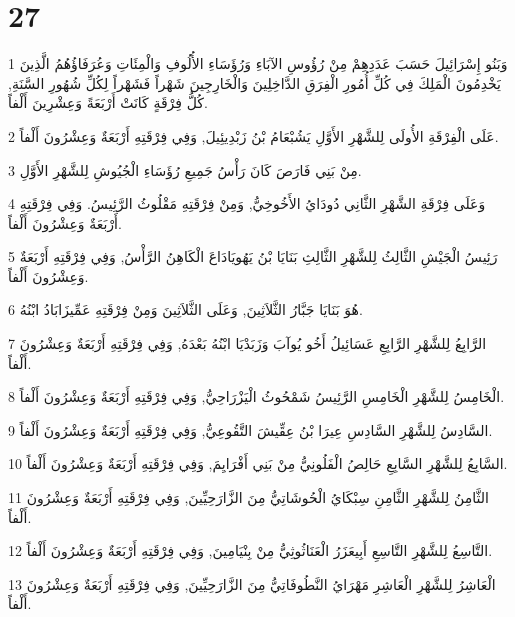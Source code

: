 \chapter{27}

\par 1 وَبَنُو إِسْرَائِيلَ حَسَبَ عَدَدِهِمْ مِنْ رُؤُوسِ الآبَاءِ وَرُؤَسَاءِ الأُلُوفِ وَالْمِئَاتِ وَعُرَفَاؤُهُمُ الَّذِينَ يَخْدِمُونَ الْمَلِكَ فِي كُلِّ أُمُورِ الْفِرَقِ الدَّاخِلِينَ وَالْخَارِجِينَ شَهْراً فَشَهْراً لِكُلِّ شُهُورِ السَّنَةِ, كُلُّ فِرْقَةٍ كَانَتْ أَرْبَعَةً وَعِشْرِينَ أَلْفاً.
\par 2 عَلَى الْفِرْقَةِ الأُولَى لِلشَّهْرِ الأَوَّلِ يَشُبْعَامُ بْنُ زَبْدِيئِيلَ, وَفِي فِرْقَتِهِ أَرْبَعَةٌ وَعِشْرُونَ أَلْفاً.
\par 3 مِنْ بَنِي فَارَصَ كَانَ رَأْسُ جَمِيعِ رُؤَسَاءِ الْجُيُوشِ لِلشَّهْرِ الأَوَّلِ.
\par 4 وَعَلَى فِرْقَةِ الشَّهْرِ الثَّانِي دُودَايُ الأَخُوخِيُّ, وَمِنْ فِرْقَتِهِ مَقْلُوثُ الرَّئِيسُ. وَفِي فِرْقَتِهِ أَرْبَعَةٌ وَعِشْرُونَ أَلْفاً.
\par 5 رَئِيسُ الْجَيْشِ الثَّالِثُ لِلشَّهْرِ الثَّالِثِ بَنَايَا بْنُ يَهُويَادَاعَ الْكَاهِنُ الرَّأْسُ, وَفِي فِرْقَتِهِ أَرْبَعَةٌ وَعِشْرُونَ أَلْفاً.
\par 6 هُوَ بَنَايَا جَبَّارُ الثَّلاَثِينَ, وَعَلَى الثَّلاَثِينَ وَمِنْ فِرْقَتِهِ عَمِّيزَابَادُ ابْنُهُ.
\par 7 الرَّابِعُ لِلشَّهْرِ الرَّابِعِ عَسَائِيلُ أَخُو يُوآبَ وَزَبَدْيَا ابْنُهُ بَعْدَهُ, وَفِي فِرْقَتِهِ أَرْبَعَةٌ وَعِشْرُونَ أَلْفاً.
\par 8 الْخَامِسُ لِلشَّهْرِ الْخَامِسِ الرَّئِيسُ شَمْحُوثُ الْيَزْرَاحِيُّ, وَفِي فِرْقَتِهِ أَرْبَعَةٌ وَعِشْرُونَ أَلْفاً.
\par 9 السَّادِسُ لِلشَّهْرِ السَّادِسِ عِيرَا بْنُ عِقِّيشَ التَّقُوعِيُّ, وَفِي فِرْقَتِهِ أَرْبَعَةٌ وَعِشْرُونَ أَلْفاً.
\par 10 السَّابِعُ لِلشَّهْرِ السَّابِعِ حَالِصُ الْفَلُونِيُّ مِنْ بَنِي أَفْرَايِمَ, وَفِي فِرْقَتِهِ أَرْبَعَةٌ وَعِشْرُونَ أَلْفاً.
\par 11 الثَّامِنُ لِلشَّهْرِ الثَّامِنِ سِبْكَايُ الْحُوشَاتِيُّ مِنَ الزَّارَحِيِّينَ, وَفِي فِرْقَتِهِ أَرْبَعَةٌ وَعِشْرُونَ أَلْفاً.
\par 12 التَّاسِعُ لِلشَّهْرِ التَّاسِعِ أَبِيعَزَرُ الْعَنَاثُوثِيُّ مِنْ بِنْيَامِينَ, وَفِي فِرْقَتِهِ أَرْبَعَةٌ وَعِشْرُونَ أَلْفاً.
\par 13 الْعَاشِرُ لِلشَّهْرِ الْعَاشِرِ مَهْرَايُ النَّطُوفَاتِيُّ مِنَ الزَّارَحِيِّينَ, وَفِي فِرْقَتِهِ أَرْبَعَةٌ وَعِشْرُونَ أَلْفاً.
